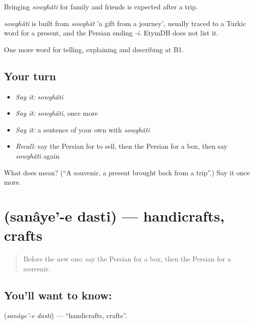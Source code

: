 Bringing \emph{sowghâti} for family and friends is expected after a trip.

\begin{cousinweb}
\emph{sowghâti} is built from \emph{sowghât} 'a gift from a journey', usually traced to a Turkic word for a present, and the Persian ending \emph{-i}. EtymDB does not list it.
\end{cousinweb}

\begin{grammarlens}[title={What you've built}]
One more word for telling, explaining and describing at B1.
\end{grammarlens}

\subsection*{Your turn}
\begin{itemize}
\raggedright
  \item \emph{Say it:} \emph{sowghâti}
  \item \emph{Say it:} \emph{sowghâti}, once more
  \item \emph{Say it:} a sentence of your own with \emph{sowghâti}
  \item \emph{Recall:} say the Persian for to sell, then the Persian for a box, then say \emph{sowghâti} again
\end{itemize}

\begin{tcolorbox}[breakable,colback=teal!4,colframe=teal!35!black,title={Before you move on}]
What does  mean? (\textquotedblleft{}A souvenir, a present brought back from a trip\textquotedblright{}.) Say it once more.
\end{tcolorbox}
\section[\texorpdfstring{\fa{صنایع} \fa{دستی} (sanâye'-e dasti)}{صنایع دستی (sanâye'-e dasti)}]{  (sanâye'-e dasti) — handicrafts, crafts}

\label{lesson:FA-C463-sanaye-e-dasti}



\begin{quote}
Before the new one: say the Persian for a box, then the Persian for a souvenir.
\end{quote}

\subsection*{You'll want to know:  }
\textbf{ } (\emph{sanâye'-e dasti}) — \textquotedblleft{}handicrafts, crafts\textquotedblright{}.

